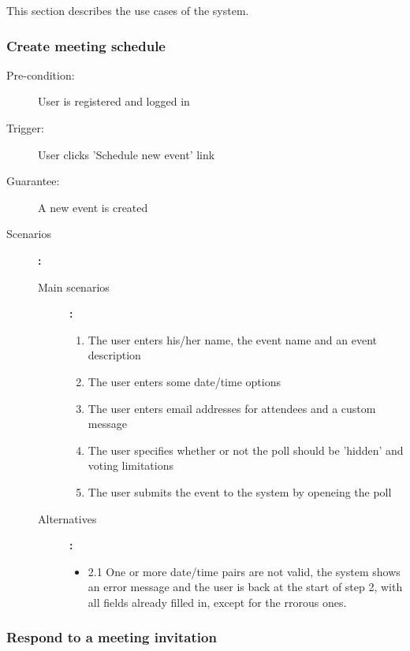 This section describes the use cases of the system.

\subsubsection{Create meeting schedule}

\begin{description}
	\item[Pre-condition:] User is registered and logged in
	\item[Trigger:] User clicks 'Schedule new event' link
	\item[Guarantee:] A new event is created
	\item[Scenarios]\textbf{:}\\
				\begin{description}
					\item[Main scenarios]\textbf{:}\\
								\begin{enumerate}
									\item The user enters his/her name, the event name and an event description
									\item The user enters some date/time options
									\item The user enters email addresses for attendees and a custom message
									\item The user specifies whether or not the poll should be 'hidden' and voting limitations
									\item The user submits the event to the system by openeing the poll
								\end{enumerate}
					\item[Alternatives]\textbf{:}\\
								\begin{itemize}
									\item 2.1 One or more date/time pairs are not valid, the system shows an error message and the user is back at the start of step 2, with all fields already filled in, except for the rrorous ones.
								\end{itemize}
				\end{description}
\end{description}


\subsubsection{Respond to a meeting invitation}

